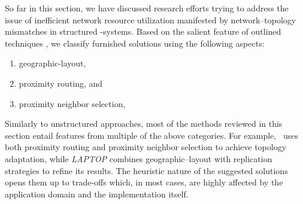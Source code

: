 
So far in this section, we have discussed research efforts 
trying to address the issue of inefficient network resource utilization 
manifested by network--topology mismatches in structured \p-systems.
Based on the salient feature of outlined techniques
\cite{CDHR2002,CDCR2002,RSS2002}, we classify furnished solutions 
using the following aspects:
\begin{enumerate}
  \item geographic-layout,
  \item proximity routing, and 
  \item proximity neighbor selection,
\end{enumerate}

Similarly to unstructured approaches, most of the methods
reviewed in this section entail features from multiple of the above categories. 
For example, \cite{KLKP2008}~uses both proximity routing 
and proximity neighbor selection to achieve topology adaptation,
while \emph{LAPTOP} combines geographic--layout with
replication strategies to refine its results.
The heuristic nature of the suggested solutions opens them up 
to trade-offs which, in most cases, are 
highly affected by the application domain and the implementation itself.

